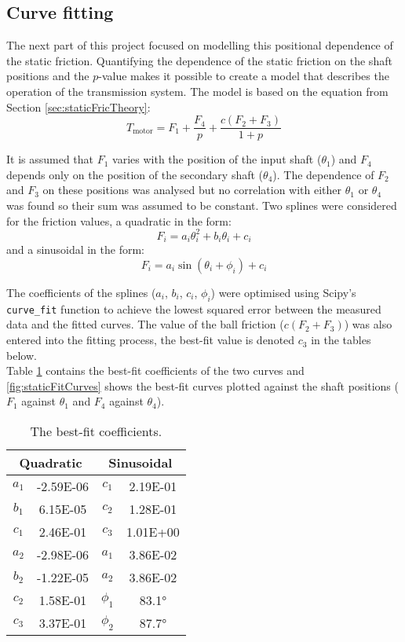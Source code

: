 \documentclass[12pt]{article}
\begin{document}
\subsection{Curve fitting}
\label{sec:staticFricCurve}
The next part of this project focused on modelling this positional dependence of the static friction. Quantifying the dependence of the static friction on the shaft positions and the $p$-value makes it possible to create a model that describes the operation of the transmission system. The model is based on the equation from Section \ref{sec:staticFricTheory}:
$$T_{\text{motor}} = F_1 + \frac{F_4}{p} + \frac{c(F_2+F_3)}{1+p}$$

It is assumed that $F_1$ varies with the position of the input shaft ($\theta_1$) and $F_4$ depends only on the position of the secondary shaft ($\theta_4$). The dependence of $F_2$ and $F_3$ on these positions was analysed but no correlation with either $\theta_1$ or $\theta_4$ was found so their sum was assumed to be constant. Two splines were considered for the friction values, a quadratic in the form:
$$F_i = a_i \theta_i^2 + b_i \theta_i + c_i$$
and a sinusoidal in the form:
$$F_i = a_i \sin\left( \theta_i + \phi_i  \right)  + c_i$$

The coefficients of the splines ($a_i$, $b_i$, $c_i$, $\phi_i$) were optimised using Scipy's \verb|curve_fit| function to achieve the lowest squared error between the measured data and the fitted curves. The value of the ball friction ($c(F_2+F_3)$) was also entered into the fitting process, the best-fit value is denoted $c_3$ in the tables below.\\

Table \ref{tab:staticFricCoeffs} contains the best-fit coefficients of the two curves and \ref{fig:staticFitCurves} shows the best-fit curves plotted against the shaft positions ($F_1$ against $\theta_1$ and $F_4$ against $\theta_4$).
 
\begin{table}[h]
    \centering
\begin{tabular}{|c|c|c|c|}
\hline
\multicolumn{2}{|c|}{Quadratic}     & \multicolumn{2}{|c|}{Sinusoidal}    \\ \hline
$a_1$        & -2.59E-06 & $c_1$         & 2.19E-01 \\ \hline
$b_1$        & 6.15E-05  & $c_2$         & 1.28E-01 \\ \hline
$c_1$        & 2.46E-01  & $c_3$         & 1.01E+00 \\ \hline
$a_2$        & -2.98E-06 & $a_1$         & 3.86E-02 \\ \hline
$b_2$        & -1.22E-05 & $a_2$         & 3.86E-02 \\ \hline
$c_2$        & 1.58E-01  & $\phi_1$         & 83.1°\\ \hline
$c_3$        & 3.37E-01  & $\phi_2$         & 87.7° \\ \hline
\end{tabular}
    \caption{The best-fit coefficients.}
    \label{tab:staticFricCoeffs}
\end{table}
\end{document}
